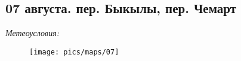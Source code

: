 \subsection{07 августа. пер. Быкылы, пер. Чемарт}
\textit{Метеоусловия: }

\begin{figure}[h!]
	\centering
	\texttt{[image: pics/maps/07]}
	\label{fig:07}
\end{figure}



\clearpage